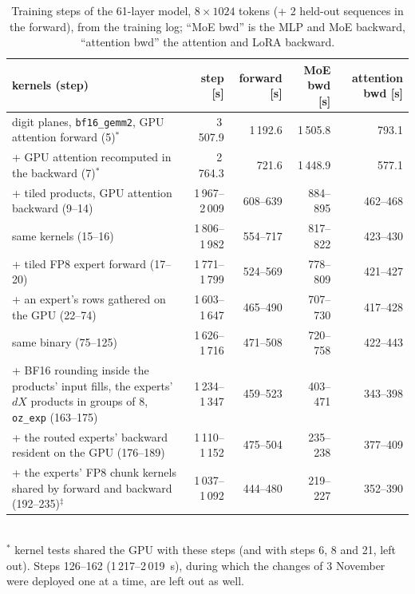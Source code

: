 \documentclass[11pt]{article}
\begin{document}
\begin{table}[t]\centering\small
\caption{Training steps of the 61-layer model, $8\times1024$ tokens (+ 2 held-out sequences in the forward), from the training log; ``MoE bwd'' is the MLP and MoE backward, ``attention bwd'' the attention and LoRA backward.}\label{tab:steps}
\begin{tabular}{p{5.5cm}rrrr}\toprule
kernels (step) & step [s] & forward [s] & MoE bwd [s] & attention bwd [s] \\\midrule
digit planes, \texttt{bf16\_gemm2}, GPU attention forward (5)$^{*}$ & 3\,507.9 & 1\,192.6 & 1\,505.8 & 793.1 \\
+ GPU attention recomputed in the backward (7)$^{*}$ & 2\,764.3 & 721.6 & 1\,448.9 & 577.1 \\
+ tiled products, GPU attention backward (9--14) & 1\,967--2\,009 & 608--639 & 884--895 & 462--468 \\
same kernels (15--16) & 1\,806--1\,982 & 554--717 & 817--822 & 423--430 \\
+ tiled FP8 expert forward (17--20) & 1\,771--1\,799 & 524--569 & 778--809 & 421--427 \\
+ an expert's rows gathered on the GPU (22--74) & 1\,603--1\,647 & 465--490 & 707--730 & 417--428 \\
same binary (75--125) & 1\,626--1\,716 & 471--508 & 720--758 & 422--443 \\
+ BF16 rounding inside the products' input fills, the experts' $dX$ products in groups of 8, \texttt{oz\_exp} (163--175) & 1\,234--1\,347 & 459--523 & 403--471 & 343--398 \\
+ the routed experts' backward resident on the GPU (176--189) & 1\,110--1\,152 & 475--504 & 235--238 & 377--409 \\
+ the experts' FP8 chunk kernels shared by forward and backward (192--235)$^{\ddagger}$ & 1\,037--1\,092 & 444--480 & 219--227 & 352--390 \\\bottomrule
\end{tabular}\\[2pt]
{\footnotesize $^{*}$ kernel tests shared the GPU with these steps (and with steps 6, 8 and 21, left out). Steps 126--162
(1\,217--2\,019~s), during which the changes of 3 November were deployed one at a time, are left out as well.}
\end{table}
\end{document}
